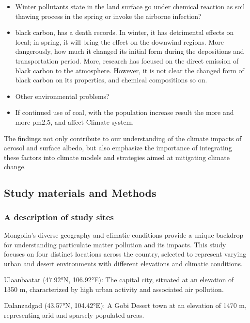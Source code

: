 \documentclass[
  11pt,
]{article}
\providecommand{\tightlist}{%
  \setlength{\itemsep}{0pt}\setlength{\parskip}{0pt}}
\begin{document}
\begin{itemize}
\tightlist
\item
  Winter pollutants state in the land surface go under chemical reaction
  as soil thawing process in the spring or invoke the airborne
  infection?
\item
  black carbon, has a death records. In winter, it has detrimental
  effects on local; in spring, it will bring the effect on the downwind
  regions. More dangerously, how much it changed its initial form during
  the depositions and transportation period. More, research has focused
  on the direct emission of black carbon to the atmosphere. However, it
  is not clear the changed form of black carbon on its properties, and
  chemical compositions so on.
\item
  Other environmental problems?
\item
  If continued use of coal, with the population increase result the more
  and more pm2.5, and affect Climate system.
\end{itemize}

The findings not only contribute to our understanding of the climate
impacts of aerosol and surface albedo, but also emphasize the importance
of integrating these factors into climate models and strategies aimed at
mitigating climate change.

\newpage

\subsection{Study materials and
Methods}\label{study-materials-and-methods}

\subsubsection{A description of study
sites}\label{a-description-of-study-sites}

Mongolia's diverse geography and climatic conditions provide a unique
backdrop for understanding particulate matter pollution and its impacts.
This study focuses on four distinct locations across the country,
selected to represent varying urban and desert environments with
different elevations and climatic conditions.

Ulaanbaatar (47.92°N, 106.92°E): The capital city, situated at an
elevation of 1350 m, characterized by high urban activity and associated
air pollution.

Dalanzadgad (43.57°N, 104.42°E): A Gobi Desert town at an elevation of
1470 m, representing arid and sparsely populated areas.
\end{document}
